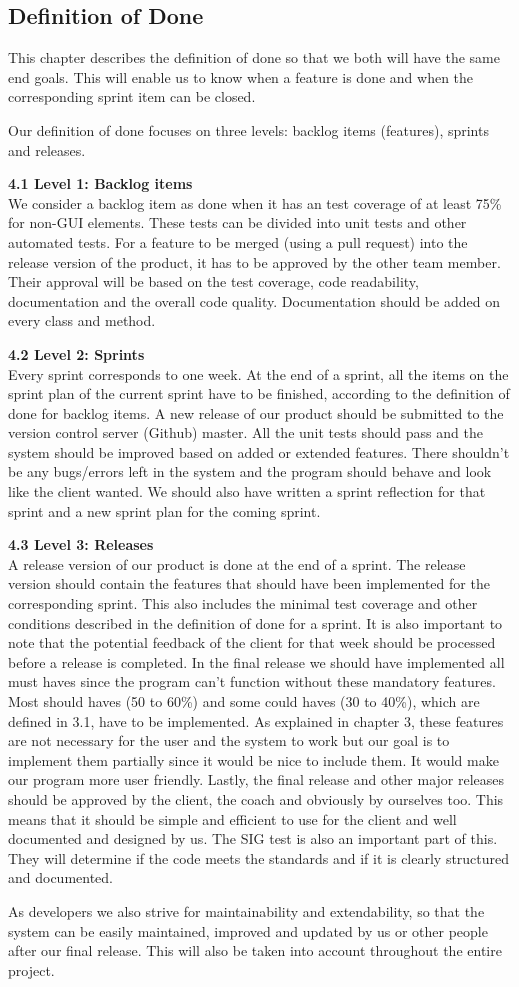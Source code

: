 \subsection{Definition of Done}
This chapter describes the definition of done so that we both will have the same end goals. This will enable us to know when a feature is done and when the corresponding sprint item can be closed.

Our definition of done focuses on three levels: backlog items (features), sprints and releases.

\textbf{4.1 Level 1: Backlog items} \\
We consider a backlog item as done when it has an test coverage of at least 75\% for non-GUI elements. These tests can be divided into unit tests and other automated tests. For a feature to be merged (using a pull request) into the release version of the product, it has to be approved by the other team member. Their approval will be based on the test coverage, code readability, documentation and the overall code quality. Documentation should be added on every class and method. 

\textbf{4.2 Level 2: Sprints} \\
Every sprint corresponds to one week. At the end of a sprint, all the items on the sprint plan of the current sprint have to be finished, according to the definition of done for backlog items. A new release of our product should be submitted to the version control server (Github) master. All the unit tests should pass and the system should be improved based on added or extended features. There shouldn't be any bugs/errors left in the system and the program should behave and look like the client wanted. We should also have written a sprint reflection for that sprint and a new sprint plan for the coming sprint. 

\textbf{4.3 Level 3: Releases}\\
A release version of our product is done at the end of a sprint. The release version should contain the features that should have been implemented for the corresponding sprint. This also includes the minimal test coverage and other conditions described in the definition of done for a sprint. It is also important to note that the potential feedback of the client for that week should be processed before a release is completed.
In the final release we should have implemented all must haves since the program can't function without these mandatory features. Most should haves (50 to 60\%) and some could haves (30 to 40\%), which are defined in 3.1, have to be implemented. As explained in chapter 3, these features are not necessary for the user and the system to work but our goal is to implement them partially since it would be nice to include them. It would make our program more user friendly. 
Lastly, the final release and other major releases should be approved by the client, the coach and obviously by ourselves too. This means that it should be simple and efficient to use for the client and well documented and designed by us. The SIG test is also an important part of this. They will determine if the code meets the standards and if it is clearly structured and documented. 

As developers we also strive for maintainability and extendability, so that the system can be easily maintained, improved and updated by us or other people after our final release. This will also be taken into account throughout the entire project.


